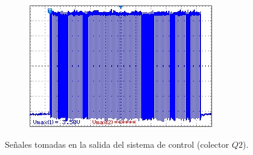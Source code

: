 \documentclass[11pt,a4paper,oneside]{article}
\begin{document}
\begin{figure}[H]
\begin{subfigure}[b]{0.33\textwidth}
    \centering
    \includegraphics[width=\textwidth]{images/out_periodo_3}
    \label{fig:out-per-3}
  \end{subfigure}
  \caption{Señales tomadas en la salida del sistema de control (colector $Q2$).}
  \label{fig:senales-out}
\end{figure}
\end{document}
